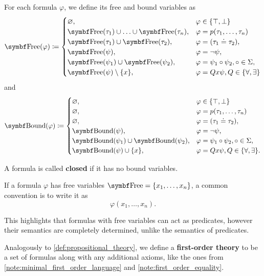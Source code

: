 \begin{definition}
  For each formula \( \varphi \), we define its free and bound variables as
  \begin{align*}
    \Bold{Free}(\varphi) \coloneqq \begin{cases}
      \varnothing,                                              &\varphi \in \{ \top, \bot \} \\
      \Bold{Free}(\tau_1) \cup \ldots \cup \Bold{Free}(\tau_n), &\varphi = p(\tau_1, \ldots, \tau_n) \\
      \Bold{Free}(\tau_1) \cup \Bold{Free}(\tau_2),             &\varphi = (\tau_1 \doteq \tau_2), \\
      \Bold{Free}(\psi),                                        &\varphi = \neg \psi, \\
      \Bold{Free}(\psi_1) \cup \Bold{Free}(\psi_2),             &\varphi = \psi_1 \circ \psi_2, \circ \in \Sigma, \\
      \Bold{Free}(\psi) \setminus \{ x \},                      &\varphi = Q x \psi, Q \in \{ \forall, \exists \}
    \end{cases}
  \end{align*}
  and
  \begin{align*}
    \Bold{Bound}(\varphi) \coloneqq \begin{cases}
      \varnothing,                                              &\varphi \in \{ \top, \bot \} \\
      \varnothing,                                              &\varphi = p(\tau_1, \ldots, \tau_n) \\
      \varnothing,                                              &\varphi = (\tau_1 \doteq \tau_2), \\
      \Bold{Bound}(\psi),                                       &\varphi = \neg \psi, \\
      \Bold{Bound}(\psi_1) \cup \Bold{Bound}(\psi_2),           &\varphi = \psi_1 \circ \psi_2, \circ \in \Sigma, \\
      \Bold{Bound}(\psi) \cup \{ x \},                          &\varphi = Q x \psi, Q \in \{ \forall, \exists \}.
    \end{cases}
  \end{align*}

  A formula is called \textbf{closed} if it has no bound variables.

  If a formula \( \varphi \) has free variables \( \Bold{Free} = \{ x_1, \ldots, x_n \} \), a common convention is to write it as
  \begin{equation*}
    \varphi(x_1, \ldots, x_n).
  \end{equation*}

  This highlights that formulas with free variables can act as predicates, however their semantics are completely determined, unlike the semantics of predicates.

  Analogously to \cref{def:propositional_theory}, we define a \textbf{first-order theory} to be a set of formulas along with any additional axioms, like the ones from \cref{note:minimal_first_order_language} and \cref{note:first_order_equality}.
\end{definition}

